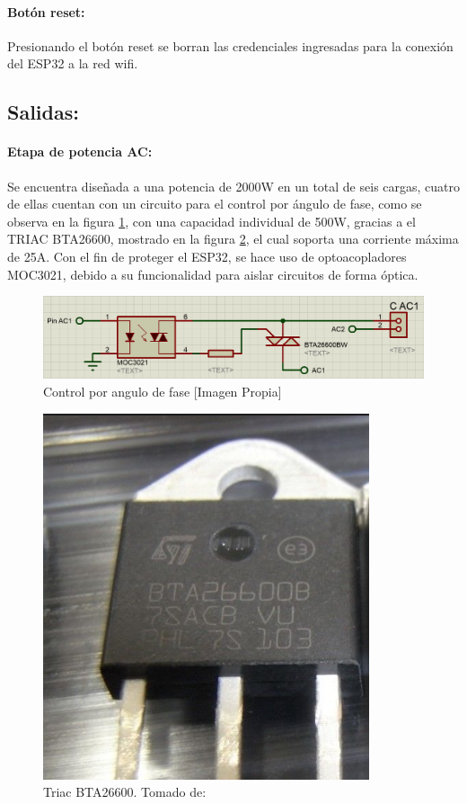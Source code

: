 	\paragraph{Botón reset:}
		Presionando el botón reset se borran las credenciales ingresadas para la conexión del ESP32 a la red wifi.\\
		
	\subsection{Salidas:}
	\paragraph{Etapa de potencia AC:}
		Se encuentra diseñada a una potencia de 2000W en un total de seis cargas, cuatro de ellas cuentan con un circuito para el control por ángulo de fase, como se observa en la figura \ref{fig:CAC1}, con una capacidad individual de 500W, gracias a el TRIAC BTA26600, mostrado en la figura \ref{fig:TRIAC}, el cual soporta una corriente máxima de 25A. Con el fin de proteger el ESP32, se hace uso de optoacopladores MOC3021, debido a su funcionalidad para aislar circuitos de forma óptica.\\
		
		\begin{figure}[H]
			\centering
			\caption{Control por angulo de fase [Imagen Propia]}
			\label{fig:CAC1}
			\includegraphics[width=0.8\linewidth]{Imagenes/CAC1}
		\end{figure}
	
		\begin{figure}[H]
			\centering
			\caption{Triac BTA26600. Tomado de: \cite{TRIAC}}
			\label{fig:TRIAC}
			\includegraphics[width=0.35\linewidth]{Imagenes/TRIAC}
		\end{figure}
	

